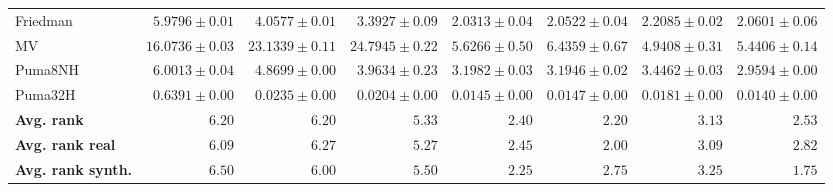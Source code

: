 \begin{table*}[!htbp]
{\begin{tabular}{lrrrrrrr}
		Friedman & $5.9796 \pm 0.01$ & $4.0577 \pm 0.01$ & $3.3927 \pm 0.09$ & $\mathbf{2.0313 \pm 0.04}$ & $2.0522 \pm 0.04$ & $2.2085 \pm 0.02$ & $2.0601 \pm 0.06$\\
		MV & $16.0736 \pm 0.03$ & $23.1339 \pm 0.11$ & $24.7945 \pm 0.22$ & $5.6266 \pm 0.50$ & $6.4359 \pm 0.67$ & $\mathbf{4.9408 \pm 0.31}$ & $5.4406 \pm 0.14$\\
		Puma8NH & $6.0013 \pm 0.04$ & $4.8699 \pm 0.00$ & $3.9634 \pm 0.23$ & $3.1982 \pm 0.03$ & $3.1946 \pm 0.02$ & $3.4462 \pm 0.03$ & $\mathbf{2.9594 \pm 0.00}$\\
		Puma32H & $0.6391 \pm 0.00$ & $0.0235 \pm 0.00$ & $0.0204 \pm 0.00$ & $0.0145 \pm 0.00$ & $0.0147 \pm 0.00$ & $0.0181 \pm 0.00$ & $\mathbf{0.0140 \pm 0.00}$\\
		\midrule
		\textbf{{Avg. rank}} & $6.20$ & $6.20$ & $5.33$ & $2.40$ & $\mathbf{2.20}$ & $3.13$ & $2.53$\\
		\textbf{{Avg. rank real}} & $6.09$ & $6.27$ & $5.27$ & $2.45$ & $\mathbf{2.00}$ & $3.09$ & $2.82$\\
		\textbf{{Avg. rank synth.}} & $6.50$ & $6.00$ & $5.50$ & $2.25$ & $2.75$ & $3.25$ & $\mathbf{1.75}$\\
		\bottomrule
	\end{tabular}}
\end{table*}
